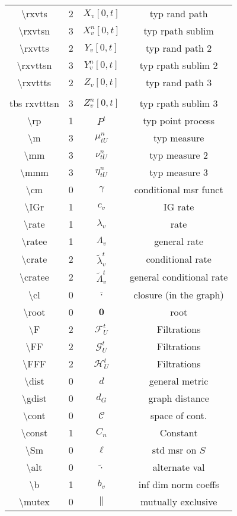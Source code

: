 \documentclass[12pt]{article}
\newcommand{\mc}{\mathcal}
\newcommand{\ov}{\overline}
\newcommand{\tbs}{\textbackslash}
\renewcommand{\root}{\mathbf{0}}				%
\renewcommand{\v}{v}							%
\renewcommand{\U}{U}							%
\newcommand{\cl}{\ov}							%
\renewcommand{\S}{S}							%
\renewcommand{\b}[1]{b_{#1}}					%
\renewcommand{\t}{t}							%
\newcommand{\numb}{n}								%
\newcommand{\rxvts}[2]{X_{#1}{#2}}					%
\newcommand{\rxvtsn}[3]{X_{#1}^{#3}{#2}}			%
\newcommand{\rxvtts}[2]{Y_{#1}{#2}}					%
\newcommand{\rxvttsn}[3]{Y_{#1}^{#3}{#2}}			%
\newcommand{\rxvttts}[2]{Z_{#1}{#2}}				%
\newcommand{\rxvtttsn}[3]{Z_{#1}^{#3}{#2}}			%
\newcommand{\rp}[1]{P^{#1}}							%
\newcommand{\m}[3]{\mu_{#2#1}^{#3}}						%
\newcommand{\mm}[3]{\nu_{#2#1}^{#3}}						%
\newcommand{\mmm}[3]{\eta_{#2#1}^{#3}}						%
\newcommand{\cm}{\gamma}							%
\newcommand{\IGr}[1]{c_{#1}}						%
\newcommand{\rate}[1]{\lambda_{#1}}					%
\newcommand{\ratee}[1]{\Lambda_{#1}}				%
\newcommand{\crate}[2]{\alt{\lambda}_{#1}^{#2}}		%
\newcommand{\cratee}[2]{\alt{\Lambda}_{#1}^{#2}} 	%
\newcommand{\F}[2]{\mc{F}_{#1}^{#2}}				%
\newcommand{\FF}[2]{\mc{G}_{#1}^{#2}}				%
\newcommand{\FFF}[2]{\mc{H}_{#1}^{#2}}				%
\newcommand{\dist}{d}								%
\newcommand{\gdist}{d_G}							%
\newcommand{\cont}{\mc{C}}							%
\newcommand{\const}[1]{C_{#1}}						%
\newcommand{\Sm}{\ell}								%
\newcommand{\alt}{\widetilde}						%
\newcommand{\mutex}{\|}								%
\begin{document}
\begin{longtable}{c|c|c|c}
\tbs rxvts&2&\(\rxvts{\v}{[0,\t]}\)					&typ rand path\\
\tbs rxvtsn&3&\(\rxvtsn{\v}{[0,\t]}{\numb}\)	&typ rpath sublim\\
\tbs rxvtts&2&\(\rxvtts{\v}{[0,\t]}\)					&typ rand path 2\\
\tbs rxvttsn&3&\(\rxvttsn{\v}{[0,\t]}{\numb}\)	&typ rpath sublim 2\\
\tbs rxvttts&2&\(\rxvttts{\v}{[0,\t]}\)				&typ rand path 3\\\\tbs rxvtttsn&3&\(\rxvtttsn{\v}{[0,\t]}{\numb}\)	&typ rpath sublim 3\\
\tbs rp&1& \(\rp{\t}\)						&typ point process\\
\tbs m&3&\(\m{\U}{\t}{\numb}\)						&typ measure\\
\tbs mm&3&\(\mm{\U}{\t}{\numb}\)						&typ measure 2\\
\tbs mmm&3&\(\mmm{\U}{\t}{\numb}\)						&typ measure 3\\
\tbs cm&0&\(\cm\)							&conditional msr funct\\
\tbs IGr&1&\(\IGr{\v}\)						&IG rate\\
\tbs rate&1&\(\rate{\v}\)					&rate\\
\tbs ratee&1&\(\ratee{\v}\)					&general rate\\
\tbs crate&2&\(\crate{\v}{\t}\)		&conditional rate\\
\tbs cratee&2&\(\cratee{\v}{\t}\)		&general conditional rate\\
\tbs cl&0&\(\cl{\cdot}\)			&closure (in the graph)\\
\tbs root&0&\(\root\)				&root\\
\tbs F&2&\(\F{\U}{\t}\)&Filtrations\\
\tbs FF&2&\(\FF{\U}{\t}\)&Filtrations\\
\tbs FFF&2&\(\FFF{\U}{\t}\)&Filtrations\\
\tbs dist&0& \(\dist\)				&general metric\\
\tbs gdist &0& \(\gdist\)			&graph distance\\
\tbs cont &0& \(\cont\)				&space of cont. \\
\tbs const &1& \(\const{\numb}\)	&Constant\\
\tbs Sm&0&\(\Sm\)							&std msr on \(\S\)\\
\tbs alt&0&\(\widetilde{\cdot}\)			&alternate val\\
\tbs b&1& \(\b{\v}\)						&inf dim norm coeffs\\
\tbs mutex&0&\(\mutex\)						&mutually exclusive\\

\end{longtable}
\end{document}
